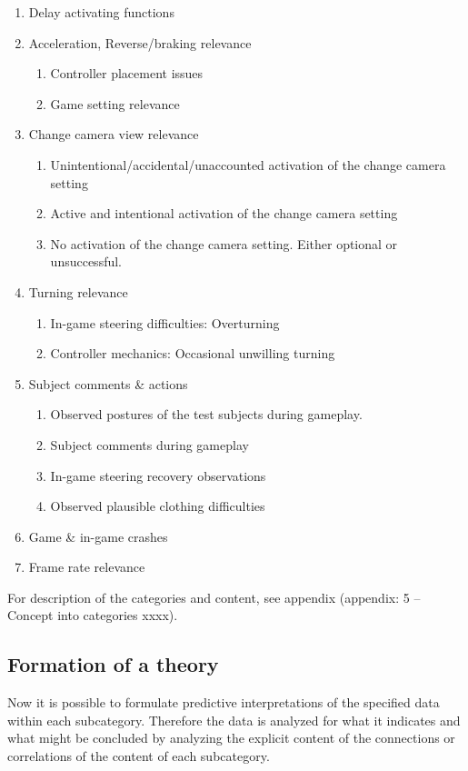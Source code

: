 \begin{enumerate}
	\item Delay activating functions
	\item Acceleration, Reverse/braking relevance
	\begin{enumerate}
		\item Controller placement issues
		\item Game setting relevance
	\end{enumerate}
	\item Change camera view relevance
	\begin{enumerate}
		\item Unintentional/accidental/unaccounted activation of the change camera setting
		\item Active and intentional activation of the change camera setting
		\item No activation of the change camera setting. Either optional or unsuccessful.
	\end{enumerate}
	\item Turning relevance
	\begin{enumerate}
		\item In-game steering difficulties: Overturning
		\item Controller mechanics: Occasional unwilling turning 
	\end{enumerate}
	\item Subject comments \& actions
	\begin{enumerate}
		\item Observed postures of the test subjects during gameplay.
		\item Subject comments during gameplay
		\item In-game steering recovery observations
		\item Observed plausible clothing difficulties
	\end{enumerate}
	\item Game \& in-game crashes
	\item Frame rate relevance
\end{enumerate}

For description of the categories and content, see appendix (appendix: 5 – Concept into categories xxxx).


\subsection*{Formation of a theory}
Now it is possible to formulate predictive interpretations of the specified data within each subcategory. 
Therefore the data is analyzed for what it indicates and what might be concluded by analyzing the explicit content of the connections or correlations of the content of each subcategory.
\bigskip


